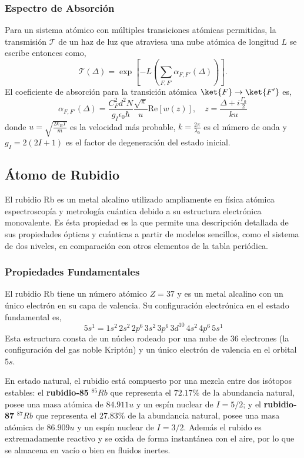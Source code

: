 \subsubsection{Espectro de Absorción}
Para un sistema atómico con múltiples transiciones atómicas permitidas, la transmisión $\mathscr{T}$ de un haz de luz que atraviesa una nube atómica de longitud $L$ se escribe entonces como,
\begin{equation}
    \mathscr{T}(\Delta) = \exp \left[ - L \left( \sum_{F, F'} \alpha_{F, F'}(\Delta) \right) \right].
\end{equation}
El coeficiente de absorción para la transición atómica $\ket{F} \to \ket{F'}$ es,
\begin{equation}
    \boxed{
    \alpha_{F, F'}(\Delta) = \frac{C_F^2 d^2 N}{g_I\epsilon_0 \hbar} \frac{\sqrt{\pi}}{u} \text{Re}[w(z)] , \quad z = \frac{\Delta + i \frac{\Gamma_0}{2}}{ku}
    }
\end{equation}
donde $u = \sqrt{\frac{2k_B T}{m}}$ es la velocidad más probable, $k = \frac{2 \pi}{\lambda_0}$ es el número de onda y $g_I =2(2 I+1)$ es el factor de degeneración del estado inicial.

\subsection{Átomo de Rubidio}
El rubidio Rb es un metal alcalino utilizado ampliamente en física atómica espectroscopía y metrología cuántica debido a su estructura electrónica monovalente. Es ésta propiedad es la que permite una descripción detallada de sus propiedades ópticas y cuánticas a partir de modelos sencillos, como el sistema de dos niveles, en comparación con otros elementos de la tabla periódica.
\subsubsection{Propiedades Fundamentales}
El rubidio Rb tiene un número atómico $Z = 37$ y es un metal alcalino con un único electrón en su capa de valencia. Su configuración electrónica en el estado fundamental es,
\begin{equation}
    [\text{Kr}]\,5s^1 = 1s^2\,2s^2\,2p^6\,3s^2\,3p^6\,3d^{10}\,4s^2\,4p^6\,5s^1
\end{equation}
Esta estructura consta de un núcleo rodeado por una nube de 36 electrones (la configuración del gas noble Kriptón) y un único electrón de valencia en el orbital $5s$.

En estado natural, el rubidio está compuesto por una mezcla entre dos isótopos estables: el \textbf{rubidio-85} $^{85}Rb$ que representa el $72.17\%$ de la abundancia natural, posee una masa atómica de $84.911 u$ y un espín nuclear de $I = 5/2$; y el \textbf{rubidio-87} $^{87}Rb$ que representa el $27.83\%$ de la abundancia natural, posee una masa atómica de $86.909 u$ y un espín nuclear de $I = 3/2$. Además el rubido es extremadamente reactivo y se oxida de forma instantánea con el aire, por lo que se almacena en vacío o bien en fluidos inertes.
